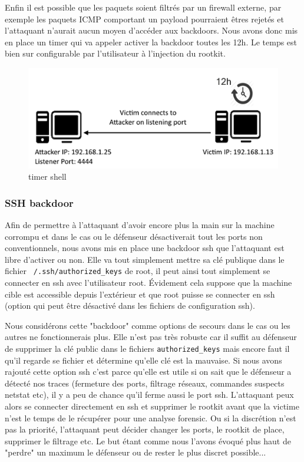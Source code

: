 \documentclass[11pt]{article}
\begin{document}
	Enfin il est possible que les paquets soient filtrés par un firewall externe, par exemple les paquets ICMP comportant un payload pourraient êtres rejetés et l'attaquant n'aurait aucun moyen d'accéder aux backdoors. Nous avons donc mis en place un timer qui va appeler activer la backdoor toutes les 12h. Le temps est bien sur configurable par l'utilisateur à l'injection du rootkit.
		
\begin{figure}[ht!]	
\begin{center}
\includegraphics{./img/timer-shell.png}

\caption[dsfsdf]{timer shell}
\end{center}
\end{figure}
					
			
		\subsubsection{SSH backdoor}
		
			Afin de permettre à l'attaquant d'avoir encore plus la main sur la machine corrompu et dans le cas ou le défenseur désactiverait tout les ports non conventionnels, nous avons mis en place une backdoor ssh que l'attaquant est libre d'activer ou non. Elle va tout simplement mettre sa clé publique  dans le fichier \texttt{~/.ssh/authorized\_keys} de root, il peut ainsi tout simplement se connecter en ssh avec l'utilisateur root. Évidement cela suppose que la machine cible est accessible depuis l'extérieur et que root puisse se connecter en ssh (option qui peut être désactivé dans les fichiers de configuration ssh).
			
			Nous considérons cette "backdoor" comme options de secours dans le cas ou les autres ne fonctionnerais plus. Elle n'est pas très robuste car il suffit au défenseur de supprimer la clé public  dans le fichiers \texttt{authorized\_keys} mais encore faut il qu'il regarde se fichier et détermine qu'elle clé est la mauvaise. 
			Si nous avons rajouté cette option ssh c'est parce qu'elle est utile si on sait que le défenseur a détecté nos traces (fermeture des ports, filtrage réseaux, commandes  suspects netstat etc), il y a peu de chance qu'il ferme aussi le port ssh. L'attaquant peux alors se connecter directement en ssh et supprimer le rootkit avant que la victime n'est le temps de le récupérer pour une analyse forensic. Ou si la discrétion n'est pas la priorité, l'attaquant peut décider changer les ports, le rootkit de place, supprimer le filtrage  etc. Le but étant comme nous l'avons évoqué plus haut de "perdre" un maximum le défenseur ou de rester le plus discret possible... 
			
\end{document}
